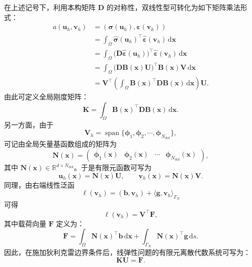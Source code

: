 在上述记号下，利用本构矩阵 $\boldsymbol{D}$ 的对称性，双线性型可转化为如下矩阵乘法形式：
\[
\begin{aligned} 
	a(\boldsymbol{u}_h,\boldsymbol{v}_h) &=(\boldsymbol{\sigma}(\boldsymbol{u}_h),\boldsymbol{\varepsilon}(\boldsymbol{v}_h))\\ &=\int_{\Omega}\hat{\boldsymbol{\sigma}}(\boldsymbol{u}_h)^{\top}\hat{\boldsymbol{\varepsilon}}(\boldsymbol{v}_h)\,\mathrm{d}\boldsymbol{x}\\ &=\int_{\Omega}\bigl(\boldsymbol{D}\hat{\boldsymbol{\varepsilon}}(\boldsymbol{u}_h)\bigr)^{\top}\hat{\boldsymbol{\varepsilon}}(\boldsymbol{v}_h)\,\mathrm{d}\boldsymbol{x}\\ &=\int_{\Omega}\bigl(\boldsymbol{D}\boldsymbol{B}(\boldsymbol{x})\boldsymbol{U}\bigr)^{\top}\boldsymbol{B}(\boldsymbol{x})\boldsymbol{V}\,\mathrm{d}\boldsymbol{x}\\ &=\boldsymbol{V}^{\top}\left(\int_{\Omega}\boldsymbol{B}(\boldsymbol{x})^{\top}\boldsymbol{D}\boldsymbol{B}(\boldsymbol{x})\,\mathrm{d}\boldsymbol{x}\right)\boldsymbol{U}. 
\end{aligned}
\]
由此可定义全局刚度矩阵：
\begin{equation} \label{eq:ch3_global_stiffness_matrix}
	\boldsymbol{K} = \int_{\Omega}\boldsymbol{B}(\boldsymbol{x})^{\top}\boldsymbol{D}\boldsymbol{B}(\boldsymbol{x})\,\mathrm{d}\boldsymbol{x}.
\end{equation}
另一方面，由于
\[
\boldsymbol{V}_h = \operatorname{span}\{\boldsymbol{\phi}_1,\boldsymbol{\phi}_2,\cdots,\boldsymbol{\phi}_{N_{\mathrm{dof}}}\},
\]
可记由全局矢量基函数组成的矩阵为
\[
\boldsymbol{N}(\boldsymbol{x}) = 
\begin{pmatrix} 
	\boldsymbol{\phi}_1(\boldsymbol{x})& \boldsymbol{\phi}_2(\boldsymbol{x})& \cdots& \boldsymbol{\phi}_{N_{\mathrm{dof}}}(\boldsymbol{x}) 
\end{pmatrix},
\]
其中 $\boldsymbol{N}(\boldsymbol{x})\in\mathbb{R}^{d\times N_{\mathrm{dof}}}$。于是有限元函数可写为
\[
\boldsymbol{u}_h(\boldsymbol{x})=\boldsymbol{N}(\boldsymbol{x})\boldsymbol{U}, \qquad \boldsymbol{v}_h(\boldsymbol{x})=\boldsymbol{N}(\boldsymbol{x})\boldsymbol{V}.
\]
同理，由右端线性泛函
\[
\ell(\boldsymbol{v}_h) = (\boldsymbol{b},\boldsymbol{v}_h) + \langle \boldsymbol{g},\boldsymbol{v}_h\rangle_{\Gamma_N}
\]
可得
\[
\ell(\boldsymbol{v}_h) = \boldsymbol{V}^{\top}\boldsymbol{F},
\]
其中载荷向量 $\boldsymbol{F}$ 定义为：
\begin{equation} \label{eq:ch3_global_load_vector}
	\boldsymbol{F} = \int_{\Omega}\boldsymbol{N}(\boldsymbol{x})^{\top}\boldsymbol{b}\,\mathrm{d}\boldsymbol{x} + \int_{\Gamma_N}\boldsymbol{N}(\boldsymbol{x})^{\top}\boldsymbol{g}\,\mathrm{d}s.
\end{equation}
因此，在施加狄利克雷边界条件后，线弹性问题的有限元离散代数系统可写为：
\begin{equation} \label{eq:ch3_fem_algebraic_system}
	\boldsymbol{K}\boldsymbol{U} = \boldsymbol{F}.
\end{equation}

